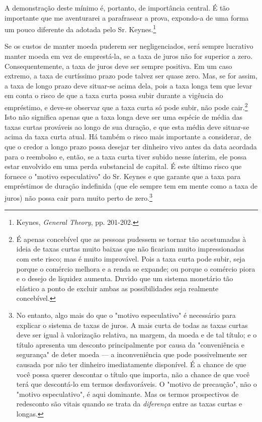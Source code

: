 \documentclass[12pt]{article}
\begin{document}
A demonstração deste mínimo é, portanto, de importância central. É tão importante que me aventurarei a parafrasear a prova, expondo-a de uma forma um pouco diferente da adotada pelo Sr. Keynes.\footnote{Keynes, \textit{General Theory}, pp. 201-202.}

Se os custos de manter moeda puderem ser negligenciados, será sempre lucrativo manter moeda em vez de emprestá-la, se a taxa de juros não for superior a zero. Consequentemente, a taxa de juros deve ser sempre positiva. Em um caso extremo, a taxa de curtíssimo prazo pode talvez ser quase zero. Mas, se for assim, a taxa de longo prazo deve situar-se acima dela, pois a taxa longa tem que levar em conta o risco de que a taxa curta possa subir durante a vigência do empréstimo, e deve-se observar que a taxa curta só pode subir, não pode cair.\footnote{É apenas concebível que as pessoas pudessem se tornar tão acostumadas à ideia de taxas curtas muito baixas que não ficariam muito impressionadas com este risco; mas é muito improvável. Pois a taxa curta pode subir, seja porque o comércio melhora e a renda se expande; ou porque o comércio piora e o desejo de liquidez aumenta. Duvido que um sistema monetário tão elástico a ponto de excluir ambas as possibilidades seja realmente concebível.} Isto não significa apenas que a taxa longa deve ser uma espécie de média das taxas curtas prováveis ao longo de sua duração, e que esta média deve situar-se acima da taxa curta atual. Há também o risco mais importante a considerar, de que o credor a longo prazo possa desejar ter dinheiro vivo antes da data acordada para o reembolso e, então, se a taxa curta tiver subido nesse ínterim, ele possa estar envolvido em uma perda substancial de capital. É este último risco que fornece o "motivo especulativo" do Sr. Keynes e que garante que a taxa para empréstimos de duração indefinida (que ele sempre tem em mente como a taxa de juros) não possa cair para muito perto de zero.\footnote{No entanto, algo mais do que o "motivo especulativo" é necessário para explicar o sistema de taxas de juros. A mais curta de todas as taxas curtas deve ser igual à valorização relativa, na margem, da moeda e de tal título; e o título apresenta um desconto principalmente por causa da "conveniência e segurança" de deter moeda — a inconveniência que pode possivelmente ser causada por não ter dinheiro imediatamente disponível. É a chance de que você possa querer descontar o título que importa, não a chance de que você terá que descontá-lo em termos desfavoráveis. O "motivo de precaução", não o "motivo especulativo", é aqui dominante. Mas os termos prospectivos de redesconto são vitais quando se trata da \textit{diferença} entre as taxas curtas e longas.}
\end{document}
